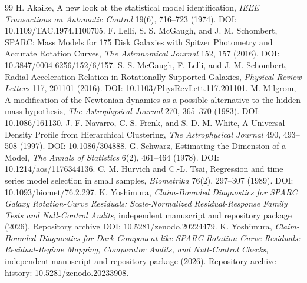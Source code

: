 \documentclass[11pt]{article}
\begin{document}
\begin{thebibliography}{99}
 H. Akaike, A new look at the statistical model identification, \textit{IEEE Transactions on Automatic Control} 19(6), 716--723 (1974). DOI: 10.1109/TAC.1974.1100705.
 F. Lelli, S. S. McGaugh, and J. M. Schombert, SPARC: Mass Models for 175 Disk Galaxies with Spitzer Photometry and Accurate Rotation Curves, \textit{The Astronomical Journal} 152, 157 (2016). DOI: 10.3847/0004-6256/152/6/157.
 S. S. McGaugh, F. Lelli, and J. M. Schombert, Radial Acceleration Relation in Rotationally Supported Galaxies, \textit{Physical Review Letters} 117, 201101 (2016). DOI: 10.1103/PhysRevLett.117.201101.
 M. Milgrom, A modification of the Newtonian dynamics as a possible alternative to the hidden mass hypothesis, \textit{The Astrophysical Journal} 270, 365--370 (1983). DOI: 10.1086/161130.
 J. F. Navarro, C. S. Frenk, and S. D. M. White, A Universal Density Profile from Hierarchical Clustering, \textit{The Astrophysical Journal} 490, 493--508 (1997). DOI: 10.1086/304888.
 G. Schwarz, Estimating the Dimension of a Model, \textit{The Annals of Statistics} 6(2), 461--464 (1978). DOI: 10.1214/aos/1176344136.
 C. M. Hurvich and C.-L. Tsai, Regression and time series model selection in small samples, \textit{Biometrika} 76(2), 297--307 (1989). DOI: 10.1093/biomet/76.2.297.
 K. Yoshimura, \textit{Claim-Bounded Diagnostics for SPARC Galaxy Rotation-Curve Residuals: Scale-Normalized Residual-Response Family Tests and Null-Control Audits}, independent manuscript and repository package (2026). Repository archive DOI: 10.5281/zenodo.20224479.
 K. Yoshimura, \textit{Claim-Bounded Diagnostics for Dark-Component-like SPARC Rotation-Curve Residuals: Residual-Regime Mapping, Comparator Audits, and Null-Control Checks}, independent manuscript and repository package (2026). Repository archive history: 10.5281/zenodo.20233908.
\end{thebibliography}
\end{document}
